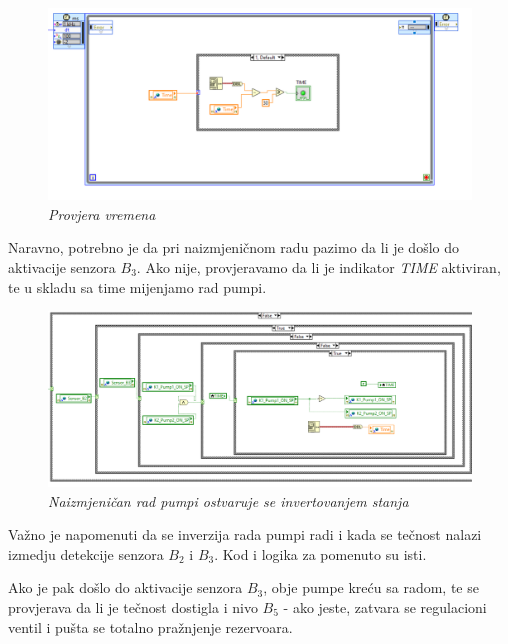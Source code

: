 \documentclass[12pt, titlepage]{article}
\begin{document}
                \begin{figure}[ht]
                    \centering
                    \includegraphics[width=\textwidth]{Slike/HAND_AUTO.vi TIME.png}
                    \caption{\textit{Provjera vremena}}
                \end{figure}

                Naravno, potrebno je da pri naizmjeničnom radu pazimo da li je došlo do aktivacije 
                senzora $B_3$. Ako nije, provjeravamo da li je indikator \textit{TIME} aktiviran, 
                te u skladu sa time mijenjamo rad pumpi. 

                \newpage 

                \begin{figure}[ht]
                    \centering
                    \includegraphics[width=\textwidth]{Slike/HAND_AUTO.vi AUTO PUMP SWITCH.png}
                    \caption{\textit{Naizmjeničan rad pumpi ostvaruje se invertovanjem stanja}}
                \end{figure}

                Važno je napomenuti da se inverzija rada pumpi radi i kada se tečnost nalazi izmedju
                detekcije senzora $B_2$ i $B_3$. Kod i logika za pomenuto su isti.

                Ako je pak došlo do aktivacije senzora $B_3$, obje pumpe kreću sa radom, te se provjerava
                da li je tečnost dostigla i nivo $B_5$ - ako jeste, zatvara se regulacioni ventil i pušta se 
                totalno pražnjenje rezervoara. 
\end{document}
